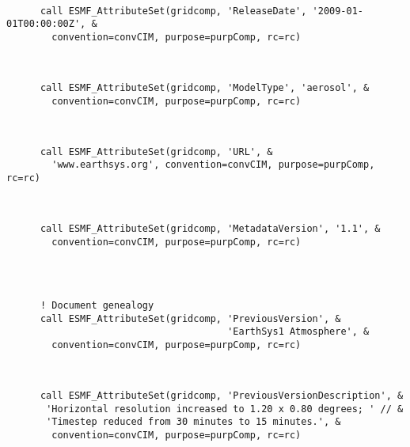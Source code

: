 
 \begin{verbatim}

      call ESMF_AttributeSet(gridcomp, 'ReleaseDate', '2009-01-01T00:00:00Z', &
        convention=convCIM, purpose=purpComp, rc=rc)
 
\end{verbatim}
 

 \begin{verbatim}

      call ESMF_AttributeSet(gridcomp, 'ModelType', 'aerosol', &
        convention=convCIM, purpose=purpComp, rc=rc)
 
\end{verbatim}
 

 \begin{verbatim}

      call ESMF_AttributeSet(gridcomp, 'URL', &
        'www.earthsys.org', convention=convCIM, purpose=purpComp, rc=rc)
 
\end{verbatim}
 

 \begin{verbatim}

      call ESMF_AttributeSet(gridcomp, 'MetadataVersion', '1.1', &
        convention=convCIM, purpose=purpComp, rc=rc)
 
\end{verbatim}
 

 \begin{verbatim}


      ! Document genealogy
      call ESMF_AttributeSet(gridcomp, 'PreviousVersion', &
                                       'EarthSys1 Atmosphere', &
        convention=convCIM, purpose=purpComp, rc=rc)
 
\end{verbatim}
 

 \begin{verbatim}

      call ESMF_AttributeSet(gridcomp, 'PreviousVersionDescription', &
       'Horizontal resolution increased to 1.20 x 0.80 degrees; ' // &
       'Timestep reduced from 30 minutes to 15 minutes.', &
        convention=convCIM, purpose=purpComp, rc=rc)
 
\end{verbatim}
 

